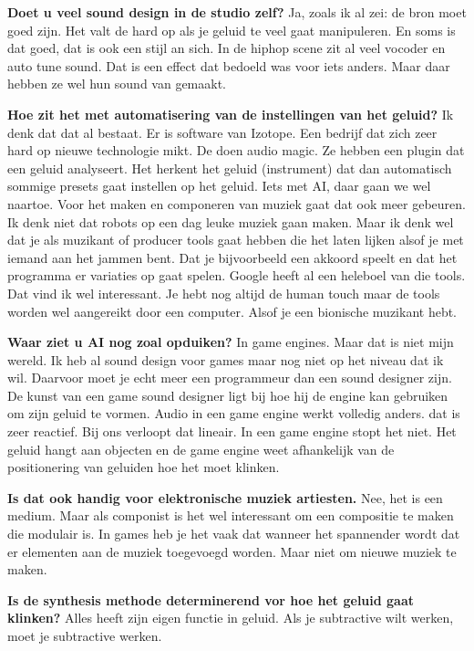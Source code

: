 \textbf{Doet u veel sound design in de studio zelf?}\newline
Ja, zoals ik al zei: de bron moet goed zijn.
Het valt de hard op als je geluid te veel gaat manipuleren. En soms is dat goed, dat is ook een stijl an sich. In de hiphop scene zit al veel vocoder en auto tune sound.
Dat is een effect dat bedoeld was voor iets anders. Maar daar hebben ze wel hun sound van gemaakt.

\textbf{Hoe zit het met automatisering van de instellingen van het geluid?}\newline
Ik denk dat dat al bestaat. Er is software van Izotope. Een bedrijf dat zich zeer hard op nieuwe technologie mikt. De doen audio magic.
Ze hebben een plugin dat een geluid analyseert. Het herkent het geluid (instrument) dat dan automatisch sommige presets gaat instellen op het geluid.
Iets met AI, daar gaan we wel naartoe. Voor het maken en componeren van muziek gaat dat ook meer gebeuren.
Ik denk niet dat robots op een dag leuke muziek gaan maken.
Maar ik denk wel dat je als muzikant of producer tools gaat hebben die het laten lijken alsof je met iemand aan het jammen bent.
Dat je bijvoorbeeld een akkoord speelt en dat het programma er variaties op gaat spelen. Google heeft al een heleboel van die tools.
Dat vind ik wel interessant. Je hebt nog altijd de human touch maar de tools worden wel aangereikt door een computer. Alsof je een bionische muzikant hebt. 

\textbf{Waar ziet u AI nog zoal opduiken?}\newline
In game engines. Maar dat is niet mijn wereld. Ik heb al sound design voor games maar nog niet op het niveau dat ik wil. Daarvoor moet je echt meer een programmeur dan een sound designer zijn.
De kunst van een game sound designer ligt bij hoe hij de engine kan gebruiken om zijn geluid te vormen.
Audio in een game engine werkt volledig anders. dat is zeer reactief. Bij ons verloopt dat lineair. In een game engine stopt het niet.
Het geluid hangt aan objecten en de game engine weet afhankelijk van de positionering van geluiden hoe het moet klinken.

\textbf{Is dat ook handig voor elektronische muziek artiesten.}\newline
Nee, het is een medium. Maar als componist is het wel interessant om een compositie te maken die modulair is.
In games heb je het vaak dat wanneer het spannender wordt dat er elementen aan de muziek toegevoegd worden.
Maar niet om nieuwe muziek te maken.

\textbf{Is de synthesis methode determinerend vor hoe het geluid gaat klinken?}\newline
Alles heeft zijn eigen functie in geluid. Als je subtractive wilt werken, moet je subtractive werken.

